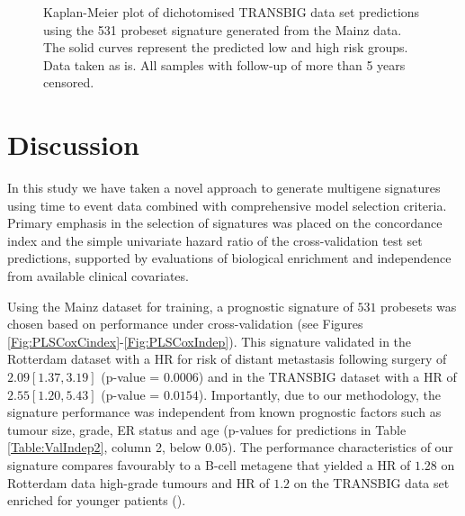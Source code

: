 \documentclass[letterpaper,12pt]{article}
\begin{document}
\begin{figure}[!th]

\centering
{}
\caption{Kaplan-Meier plot of dichotomised TRANSBIG data set predictions using the 531 probeset signature generated from the Mainz data. The solid curves represent the predicted low and high risk groups.  Data taken as is.  All samples with follow-up of more than 5 years censored.}
\label{Fig:PLSCoxKaplanMeierDesmedtVarCensoring}
\end{figure}


\section{Discussion}
In this study we have taken a novel approach to generate multigene signatures using time to event data combined with comprehensive model selection criteria. Primary emphasis in the selection of signatures was placed on the concordance index and the simple univariate hazard ratio of the cross-validation test set predictions, supported by evaluations of biological enrichment and independence from available clinical covariates. 

Using the Mainz dataset for training, a prognostic signature of $531$ probesets was chosen based on performance under cross-validation (see Figures \ref{Fig:PLSCoxCindex}-\ref{Fig:PLSCoxIndep}). This signature validated in the Rotterdam dataset with a HR for risk of distant metastasis following surgery of $2.09 [1.37, 3.19]$ (p-value = $0.0006$) and in the TRANSBIG dataset with a HR of $2.55 [1.20, 5.43]$ (p-value = $0.0154$). Importantly, due to our methodology, the signature performance was independent from known prognostic factors such as tumour size, grade, ER status and age (p-values for predictions in Table \ref{Table:ValIndep2}, column 2, below $0.05$). The performance characteristics of our signature compares favourably to a B-cell metagene that yielded a HR of $1.28$ on Rotterdam data high-grade tumours and HR of $1.2$ on the TRANSBIG data set enriched for younger patients (\citet{Schmidt:08}). 
\end{document}
